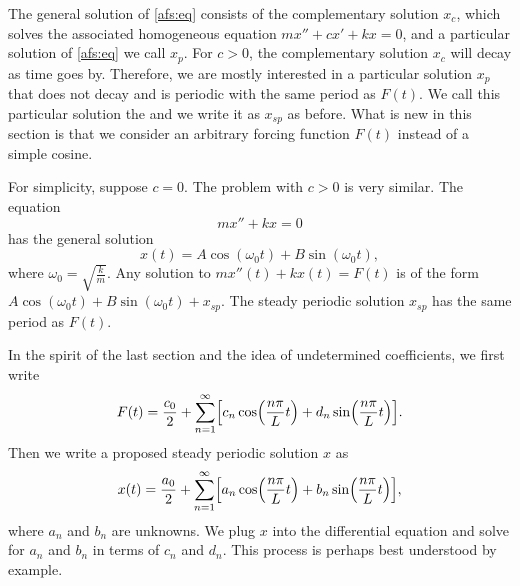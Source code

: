 The general solution of \eqref{afs:eq} consists of the complementary solution $x_c$, which
solves the associated homogeneous equation $mx'' + cx' + kx = 0$, and
a particular solution of \eqref{afs:eq} we call $x_p$.  For $c > 0$,
the complementary solution $x_c$ will decay as time goes by.
Therefore,
we are mostly interested
in a particular solution $x_p$ that does not decay
and is periodic with the same period as $F(t)$.  We call this particular
solution
the \emph{} and we write it as $x_{sp}$ as before.
What is new in this section is that we consider an arbitrary
forcing function $F(t)$ instead of a simple cosine.

For simplicity, suppose $c=0$.  The problem with $c > 0$ is very
similar.
The equation
\begin{equation*}
mx'' + kx = 0 
\end{equation*}
has the general solution
\begin{equation*}
x(t) = A \cos (\omega_0 t) + 
B \sin (\omega_0 t) ,
\end{equation*}
where $\omega_0 = \sqrt{\frac{k}{m}}$.
Any solution to
$mx''(t) + kx(t) = F(t)$ is of the form
$A \cos (\omega_0 t) + B \sin (\omega_0 t) + x_{sp}$.
The steady
periodic solution $x_{sp}$ has the same period as $F(t)$.

In the spirit of the last section and the idea of undetermined coefficients,
we first write
\begin{equation*}
F(t) = \frac{c_0}{2} + \sum_{n=1}^\infty
\Bigl[
c_n \cos \Bigl( \frac{n \pi}{L} t \Bigr) +
d_n \sin \Bigl( \frac{n \pi}{L} t \Bigr)
\Bigr] .
\end{equation*}
Then we write a proposed steady periodic solution $x$ as
\begin{equation*}
x(t) = \frac{a_0}{2} + \sum_{n=1}^\infty
\Bigl[
a_n \cos \Bigl( \frac{n \pi}{L} t \Bigr) +
b_n \sin \Bigl( \frac{n \pi}{L} t \Bigr)
\Bigr],
\end{equation*}
where $a_n$ and $b_n$ are unknowns.
We plug $x$ into the differential equation and solve for $a_n$ and
$b_n$ in terms of $c_n$ and $d_n$.  This process
is perhaps best understood by example.
\pagebreak[2]

